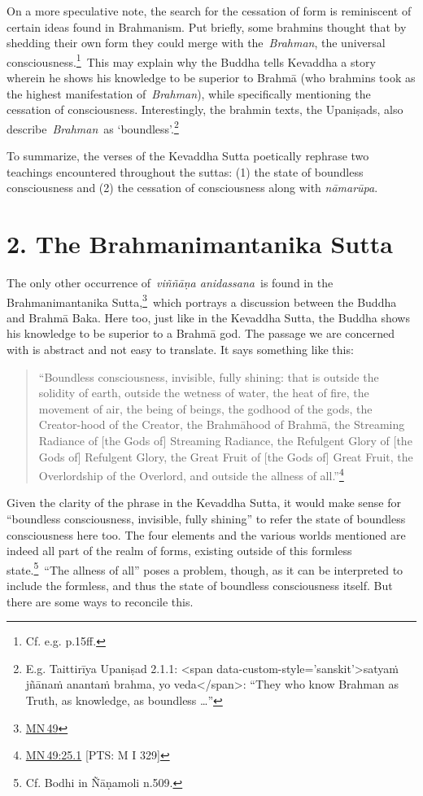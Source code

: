 \documentclass[10pt, openany]{book}
\begin{document}
On a more speculative note, the search for the cessation of form is reminiscent of certain ideas found in Brahmanism. Put briefly, some brahmins thought that by shedding their own form they could merge with the \textit{Brahman}, the universal consciousness.\footnote {Cf. e.g. \cite{Falk} p.15ff.} This may explain why the Buddha tells Kevaddha a story wherein he shows his knowledge to be superior to Brahmā (who brahmins took as the highest manifestation of \textit{Brahman}), while specifically mentioning the cessation of consciousness. Interestingly, the brahmin texts, the Upaniṣads, also describe \textit{Brahman} as ‘boundless’.\footnote {E.g. Taittirīya Upaniṣad 2.1.1: <span data-custom-style='sanskit'>satyaṁ jñānaṁ anantaṁ brahma, yo veda</span>: “They who know Brahman as Truth, as knowledge, as boundless …”}


To summarize, the verses of the Kevaddha Sutta poetically rephrase two teachings encountered throughout the suttas: (1) the state of boundless consciousness and (2) the cessation of consciousness along with \textit{nāmarūpa}.


\chapter{2. The Brahmanimantanika Sutta}
The only other occurrence of \textit{viññāṇa anidassana} is found in the Brahmanimantanika Sutta,\footnote {\href{https://suttacentral.net/mn49/en/sujato}{MN 49}} which portrays a discussion between the Buddha and Brahmā Baka. Here too, just like in the Kevaddha Sutta, the Buddha shows his knowledge to be superior to a Brahmā god. The passage we are concerned with is abstract and not easy to translate. It says something like this:


\begin{quote}


“Boundless consciousness, invisible, fully shining: that is outside the solidity of earth, outside the wetness of water, the heat of fire, the movement of air, the being of beings, the godhood of the gods, the Creator-hood of the Creator, the Brahmāhood of Brahmā, the Streaming Radiance of [the Gods of] Streaming Radiance, the Refulgent Glory of [the Gods of] Refulgent Glory, the Great Fruit of [the Gods of] Great Fruit, the Overlordship of the Overlord, and outside the allness of all.”\footnote {\href{https://suttacentral.net/mn49/en/sujato\#25.1}{MN 49:25.1} [PTS: M I 329]}




\end{quote}
Given the clarity of the phrase in the Kevaddha Sutta, it would make sense for “boundless consciousness, invisible, fully shining” to refer the state of boundless consciousness here too. The four elements and the various worlds mentioned are indeed all part of the realm of forms, existing outside of this formless state.\footnote {Cf. Bodhi in Ñāṇamoli n.509.} “The allness of all” poses a problem, though, as it can be interpreted to include the formless, and thus the state of boundless consciousness itself. But there are some ways to reconcile this.
\end{document}
